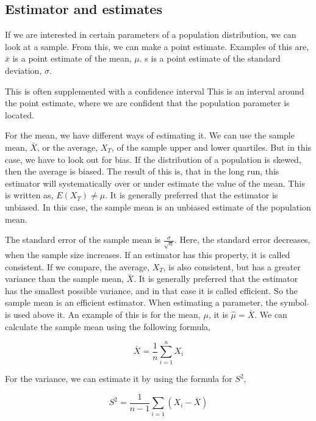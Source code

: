 \subsection{Estimator and estimates}
If we are interested in certain parameters of a population distribution, we can look at a sample. From this, we can make a point estimate. 
\newline
Examples of this are, 
\newline
$\bar{x}$ is a point estimate of the mean, $\mu$.
\newline
s is a point estimate of the standard deviation, $\sigma$.
\newline

\noindent This is often supplemented with a confidence interval
\newline
This is an interval around the point estimate, where we are confident that the population parameter is located.
\newline

\noindent For the mean, we have different ways of estimating it. We can use the sample mean, $\bar{X}$, or the average, $X_T$, of the sample upper and lower quartiles. 
But in this case, we have to look out for bias. If the distribution of a population is skewed, then the average is biased. The result of this is, that in the long run, this estimator will systematically over or under estimate the value of the mean. This is written as,
\newline
$E(X_T) \neq \mu$.
\newline
It is generally preferred that the estimator is unbiased. In this case, the sample mean is an unbiased estimate of the population mean.
\newline

\noindent The standard error of the sample mean is $\frac{\sigma}{\sqrt{n}}$. Here, the standard error decreases, when the sample size increases. If an estimator has this property, it is called consistent. If we compare, the average, $X_T$, is also consistent, but has a greater variance than the sample mean, $\bar{X}$. 
\newline
It is generally preferred that the estimator has the smallest possible variance, and in that case it is called efficient. So the sample mean is an efficient estimator.
\newline
When estimating a parameter, the symbol $\hat{}$ is used above it. An example of this is for the mean, $\mu$, it is $\hat{\mu} = \bar{X}$.
\newline
We can calculate the sample mean using the following formula,

\begin{equation}
	\bar{X}=\frac{1}{n} \sum_{i=1}^{n}X_i
\end{equation}


\noindent For the variance, we can estimate it by using the formula for $S^2$,

\begin{equation}
	S^2=\frac{1}{n-1} \sum_{i=1}(X_i-\bar{X})
\end{equation}
